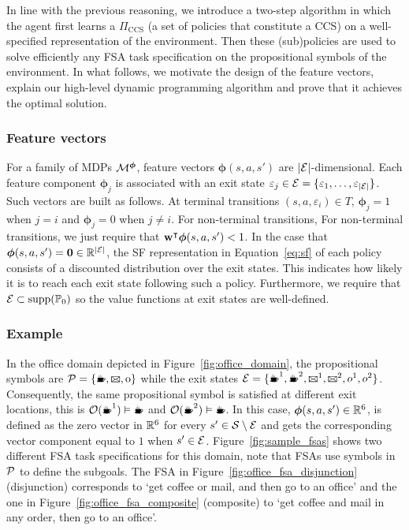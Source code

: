 In line with the previous reasoning, we introduce a two-step algorithm in which the agent first learns a $\Pi_{\text{CCS}}$ (a set of policies that constitute a CCS) on a well-specified representation of the environment. Then these (sub)policies are used to solve efficiently any FSA task specification on the propositional symbols of the environment. In what follows, we motivate the design of the feature vectors, explain our high-level dynamic programming algorithm and prove that it achieves the optimal solution.

 \subsubsection{Feature vectors} For a family of MDPs $\mathcal{M}^{\boldsymbol{\phi}}$, feature vectors $\boldsymbol\phi(s, a, s')$ are \mbox{$\lvert\mathcal{E}\rvert$-dimensional}. Each feature component $\boldsymbol\phi_j$ is associated with an exit state $\varepsilon_j\in\mathcal{E}=\{\varepsilon_1,\ldots,\varepsilon_{\lvert\mathcal{E}\rvert}\}$. Such vectors are built as follows. At terminal transitions $(s, a, \varepsilon_i)\in T$, $\boldsymbol\phi_{j} = 1$ when $j=i$ and $\boldsymbol\phi_{j}=0$ when $j\neq i$. For non-terminal transitions,  For non-terminal transitions, we just require that $\mathbf{w}^\intercal\boldsymbol\phi(s, a, s')<1$. In the case that ${\boldsymbol\phi(s, a, s')=\textbf{0}\in\mathbb{R}^{\lvert\mathcal{E}\rvert}}$, the SF representation in Equation~\eqref{eq:sf} of each policy consists of a discounted distribution over the exit states. This indicates how likely it is to reach each exit state following such a policy. Furthermore, we require that $\mathcal{E}\subset\text{supp}(\mathbb{P}_0)$ so the value functions at exit states are well-defined.

 \subsubsection{Example} In the office domain depicted in Figure~\ref{fig:office_domain}, the propositional symbols are $\cP=\{\text{\coffee}, \text{\mail}, \text{o}\}$ while the exit states $\cE=\{\text{\coffee}^1, \text{\coffee}^2,\text{\mail}^1,\text{\mail}^2,o^1,o^2\}$. Consequently, the same propositional symbol is satisfied at different exit locations, this is $\cO(\text{\coffee}^1)\vDash\text{\coffee}$ and $\cO(\text{\coffee}^2)\vDash\text{\coffee}$. In this case, $\boldsymbol\phi(s, a, s')\in\mathbb{R}^6$, is defined as the zero vector in $\mathbb{R}^6$ for every $s'\in\mathcal{S}\setminus\mathcal{E}$ and gets the corresponding vector component equal to $1$ when $s'\in\mathcal{E}$. Figure~\ref{fig:sample_fsas} shows two different FSA task specifications for this domain, note that FSAs use symbols in $\mathcal{P}$ to define the subgoals. The FSA in Figure~\ref{fig:office_fsa_disjunction} (disjunction) corresponds to `get coffee or mail, and then go to an office' and the one in Figure~\ref{fig:office_fsa_composite} (composite) to `get coffee and mail in any order, then go to an office'. 


